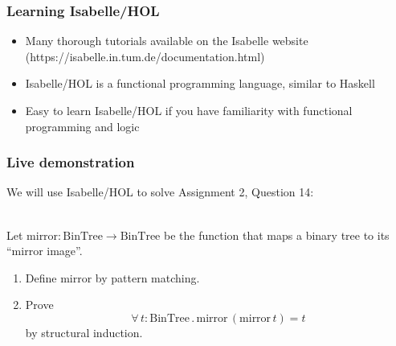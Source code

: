 \documentclass{beamer}
\begin{document}
  \begin{frame}
    \frametitle{Learning Isabelle/HOL}
    \begin{itemize}
      \item Many thorough tutorials available on the Isabelle website
      (https://isabelle.in.tum.de/documentation.html)
      \item Isabelle/HOL is a functional programming language, similar to Haskell
      \item Easy to learn Isabelle/HOL if you have familiarity with functional
      programming and logic
    \end{itemize}
  \end{frame}

  \begin{frame}
    \frametitle{Live demonstration}
    We will use Isabelle/HOL to solve Assignment 2, Question 14:\\~\

    Let $\textrm{mirror} : \textrm{BinTree} \rightarrow
    \textrm{BinTree}$
    be the function that maps a binary tree to its ``mirror image''.

    \begin{enumerate}
      \item Define $\textrm{mirror}$ by pattern matching.

      \item Prove \[\forall\, t : \textrm{BinTree} \mathrel.
      \textrm{mirror}\,(\textrm{mirror}\,t) = t\] by structural
      induction.\\~\

    \end{enumerate}
  \end{frame}
\end{document}
